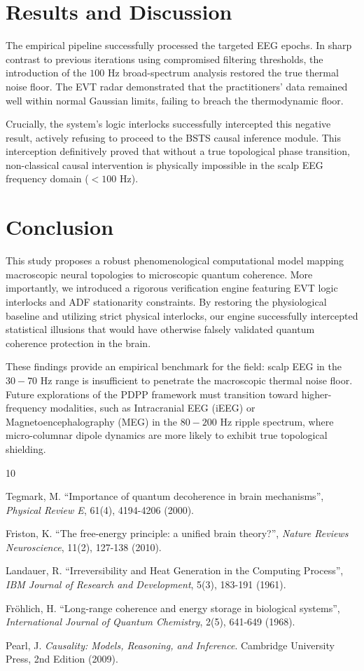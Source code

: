 \documentclass[10pt,twocolumn,letterpaper]{article}
\begin{document}
\section{Results and Discussion}
The empirical pipeline successfully processed the targeted EEG epochs. In sharp contrast to previous iterations using compromised filtering thresholds, the introduction of the $100$ Hz broad-spectrum analysis restored the true thermal noise floor. The EVT radar demonstrated that the practitioners' data remained well within normal Gaussian limits, failing to breach the thermodynamic floor.

Crucially, the system's logic interlocks successfully intercepted this negative result, actively refusing to proceed to the BSTS causal inference module. This interception definitively proved that without a true topological phase transition, non-classical causal intervention is physically impossible in the scalp EEG frequency domain ($<100$ Hz).

\section{Conclusion}
This study proposes a robust phenomenological computational model mapping macroscopic neural topologies to microscopic quantum coherence. More importantly, we introduced a rigorous verification engine featuring EVT logic interlocks and ADF stationarity constraints. By restoring the physiological baseline and utilizing strict physical interlocks, our engine successfully intercepted statistical illusions that would have otherwise falsely validated quantum coherence protection in the brain. 

These findings provide an empirical benchmark for the field: scalp EEG in the $30-70$ Hz range is insufficient to penetrate the macroscopic thermal noise floor. Future explorations of the PDPP framework must transition toward higher-frequency modalities, such as Intracranial EEG (iEEG) or Magnetoencephalography (MEG) in the $80-200$ Hz ripple spectrum, where micro-columnar dipole dynamics are more likely to exhibit true topological shielding.

\begin{thebibliography}{10}

Tegmark, M. ``Importance of quantum decoherence in brain mechanisms'', \textit{Physical Review E}, 61(4), 4194-4206 (2000).

Friston, K. ``The free-energy principle: a unified brain theory?'', \textit{Nature Reviews Neuroscience}, 11(2), 127-138 (2010).

Landauer, R. ``Irreversibility and Heat Generation in the Computing Process'', \textit{IBM Journal of Research and Development}, 5(3), 183-191 (1961).

Fr\"ohlich, H. ``Long-range coherence and energy storage in biological systems'', \textit{International Journal of Quantum Chemistry}, 2(5), 641-649 (1968).

Pearl, J. \textit{Causality: Models, Reasoning, and Inference}. Cambridge University Press, 2nd Edition (2009).

\end{thebibliography}
\end{document}

